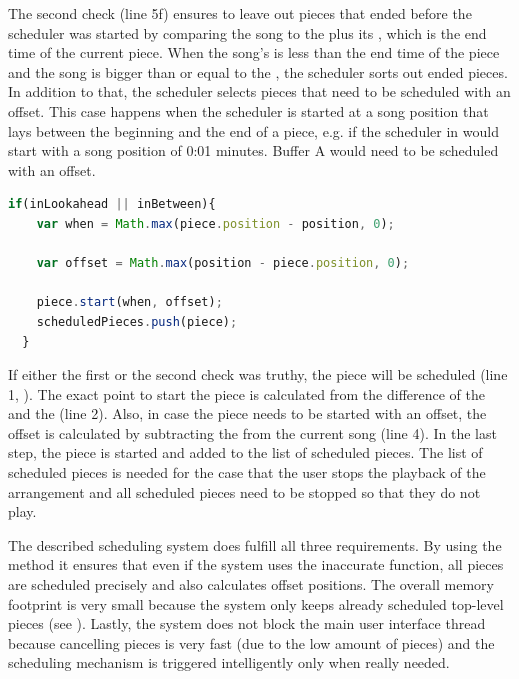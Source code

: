 The second check (line 5f) ensures to leave out pieces that ended before the scheduler was started by comparing the song  to the  plus its , which is the end time of the current piece. When the song's  is less than the end time of the piece and the song  is bigger than or equal to the , the scheduler sorts out ended pieces. In addition to that, the scheduler selects pieces that need to be scheduled with an offset. This case happens when the scheduler is started at a song position that lays between the beginning and the end of a piece, e.g. if the scheduler in  would start with a song position of 0:01 minutes. Buffer A would need to be scheduled with an offset.

\begin{lstlisting}[language=JavaScript, caption=Scheduling pieces, label=lst:scheduling-pieces-p2]
  if(inLookahead || inBetween){
    var when = Math.max(piece.position - position, 0);

    var offset = Math.max(position - piece.position, 0);

    piece.start(when, offset);
    scheduledPieces.push(piece);
  }
\end{lstlisting}

If either the first or the second check was truthy, the piece will be scheduled (line 1, ). The exact point  to start the piece is calculated from the difference of the  and the  (line 2). Also, in case the piece needs to be started with an offset, the offset is calculated by subtracting the  from the current song  (line 4). In the last step, the piece is started and added to the list of scheduled pieces. The list of scheduled pieces is needed for the case that the user stops the playback of the arrangement and all scheduled pieces need to be stopped so that they do not play.

The described scheduling system does fulfill all three requirements. By using the  method it ensures that even if the system uses the inaccurate  function, all pieces are scheduled precisely and also calculates offset positions. The overall memory footprint is very small because the system only keeps already scheduled top-level pieces (see ). Lastly, the system does not block the main user interface thread because cancelling pieces is very fast (due to the low amount of pieces) and the scheduling mechanism is triggered intelligently only when really needed.

